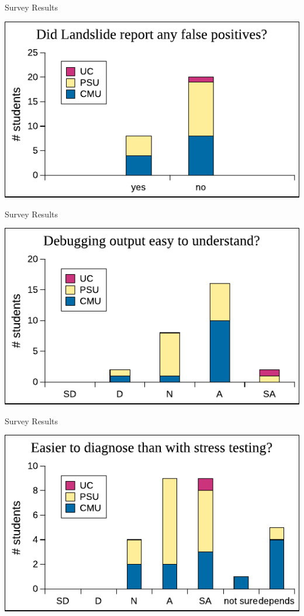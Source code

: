 \documentclass[xcolor=dvipsnames]{beamer}
\begin{document}
\begin{frame}{Survey Results} \begin{center} \includegraphics[width=\textwidth]{../survey4.pdf} \end{center} \end{frame}
\begin{frame}{Survey Results} \begin{center} \includegraphics[width=\textwidth]{../survey5.pdf} \end{center} \end{frame}
\begin{frame}{Survey Results} \begin{center} \includegraphics[width=\textwidth]{../survey6.pdf} \end{center} \end{frame}
\end{document}
